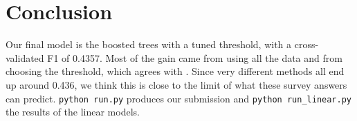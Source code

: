 \documentclass[11pt,a4paper]{article}
\begin{document}
\section{Conclusion}

Our final model is the boosted trees with a tuned threshold, with a cross-validated F1 of 0.4357. Most of the gain came from using all the data and from choosing the threshold, which agrees with \cite{domingos2012few}. Since very different methods all end up around 0.436, we think this is close to the limit of what these survey answers can predict. \texttt{python run.py} produces our submission and \texttt{python run\_linear.py} the results of the linear models.


\small

\end{document}
